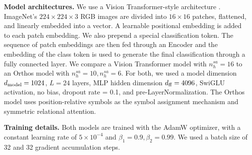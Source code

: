 \textbf{Model architectures.} We use a Vision Transformer-style architecture \citep{dosovitskiyImageWorth16x162020}. ImageNet's $224 \times 224 \times 3$ RGB images are divided into $16 \times 16$ patches, flattened, and linearly embedded into a vector. A learnable positional embedding is added to each patch embedding. We also prepend a special classification token. The sequence of patch embeddings are then fed through an Encoder and the embedding of the class token is used to generate the final classification through a fully connected layer. We compare a Vision Transformer model with $n_h^{sa} = 16$ to an Orthos model with $n_h^{sa} = 10, n_h^{sa} = 6$. For both, we used a model dimension $d_{\mathrm{model}} = 1024$, $L = 24$ layers, MLP hidden dimension $d_{\mathrm{ff}} = 4096$, SwiGLU activation, no bias, dropout rate = 0.1, and pre-LayerNormalization. The Orthos model uses position-relative symbols as the symbol assignment mechanism and symmetric relational attention.

\textbf{Training details.} Both models are trained with the AdamW optimizer, with a constant learning rate of $5 \times 10^{-4}$ and $\beta_1 = 0.9, \beta_2 = 0.99$. We used a batch size of 32 and 32 gradient accumulation steps.

